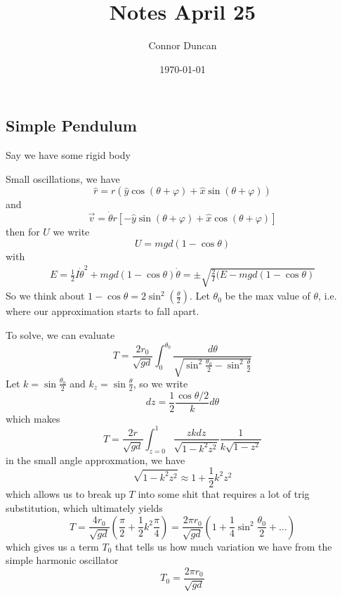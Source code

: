 \documentclass{article}
\author{Connor Duncan}
\date{\today}
\title{Notes April 25}
\theoremstyle{definition}
\begin{document}
\maketitle


\subsection{Simple Pendulum}
Say we have some rigid body
\begin{center}
\end{center}
Small oscillations, we have
\begin{equation}
	\hat r=r(\hat y\cos(\theta+\varphi)+\hat x\sin(\theta+\varphi))
\end{equation}
and 
\begin{equation}
	\vec{v}=\dot\theta r\left[-\hat y\sin(\theta+\varphi)+\hat x\cos(\theta+\varphi)\right]
\end{equation}
then for $U$ we write
\begin{equation}
	U=mgd(1-\cos\theta)
\end{equation}
with 
\begin{align}
	E=\frac{1}{2}I\dot\theta^2+mgd(1-\cos\theta)
	\dot\theta=\pm\sqrt{\frac{2}{I}(E-mgd(1-\cos\theta)}
\end{align}
So we think about $1-\cos\theta=2\sin^2(\frac{\theta}{2})$. Let $\theta_0$ be the max value of $\theta$, i.e. where our approximation starts to fall apart.

To solve, we can evaluate
\begin{equation}
	T=\frac{2r_0}{\sqrt{gd}}\int_0^{\theta_0}\frac{d\theta}{\sqrt{\sin^2\frac{\theta_0}{2}-\sin^2\frac{\theta}{2}}}
\end{equation}
Let $k=\sin\frac{\theta_0}{2}$ and $k_z=\sin\frac{\theta}{2}$, so we write
\begin{equation}
	dz=\frac{1}{2}\frac{\cos\theta/2}{k}d\theta
\end{equation}
which makes 
\begin{equation}
	T=\frac{2r}{\sqrt{gd}}\int_{z=0}^1\frac{zkdz}{\sqrt{1-k^2z^2}}\frac{1}{k\sqrt{1-z^2}}
\end{equation}
in the small angle approxmation, we have 
\begin{equation}
	\sqrt{1-k^2z^2}\approx 1+\frac{1}{2}k^2z^2
\end{equation}
which allows us to break up $T$ into some shit that requires a lot of trig substitution, which ultimately yields
\begin{equation}
	T=\frac{4r_0}{\sqrt{gd}}\left(\frac{\pi}{2}+\frac{1}{2}k^2\frac{\pi}{4}\right)=\frac{2\pi r_0}{\sqrt{gd}}\left(1+\frac{1}{4}\sin^2\frac{\theta_0}{2}+\ldots\right)
\end{equation}
which gives us a term $T_0$ that tells us how much variation we have from the simple harmonic oscillator
\begin{equation}
	T_0=\frac{2\pi r_0}{\sqrt{gd}}
\end{equation}
\end{document}

